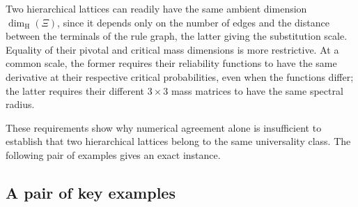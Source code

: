 \documentclass[scheme=plain,11pt]{ctexart}
\theoremstyle{definition}
\theoremstyle{remark}
\newcommand{\dimhaus}{\dim_{\mathrm H}}
\begin{document}
Two hierarchical lattices can readily have the same ambient dimension $\dimhaus(\Xi)$, since it depends only on the number of edges and the distance between the terminals of the rule graph, the latter giving the substitution scale.
Equality of their pivotal and critical mass dimensions is more restrictive.
At a common scale, the former requires their reliability functions to have the same derivative at their respective critical probabilities, even when the functions differ;
the latter requires their different $3\times3$ mass matrices to have the same spectral radius.

These requirements show why numerical agreement alone is insufficient to establish that two hierarchical lattices belong to the same universality class.
The following pair of examples gives an exact instance.












\subsection{A pair of key examples}
\end{document}
